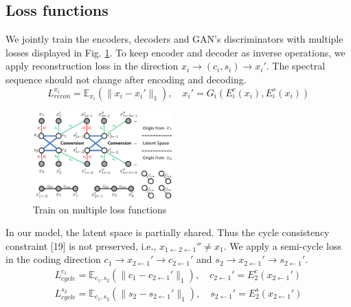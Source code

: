 \documentclass{article}
\begin{document}
\subsection{Loss functions}
We jointly train the encoders, decoders and GAN's discriminators with multiple losses displayed in Fig. \ref{loss}. To keep encoder and decoder as inverse operations, we apply reconstruction loss in the direction $x_i \rightarrow (c_i, s_i) \rightarrow x_i'$. The spectral sequence should not change after encoding and decoding.
\begin{equation}
L_{recon}^{x_i} = \mathbb{E}_{x_i}(\| x_i - x_i' \|_1), \quad x_i' = G_i(E_i^c(x_i), E_i^s(x_i))
\end{equation}

\begin{figure}[htb]
\includegraphics[width=0.48\textwidth]{FIG/loss}
\caption{Train on multiple loss functions}
\label{loss}
\end{figure}

In our model, the latent space is partially shared. Thus the cycle consistency constraint [19] is not preserved, i.e., $x_{1\leftarrow2\leftarrow1}'' \neq x_1$. We apply a semi-cycle loss in the coding direction $c_1 \rightarrow x_{2\leftarrow1}' \rightarrow c_{2\leftarrow1}'$ and $s_2 \rightarrow x_{2\leftarrow1}' \rightarrow s_{2\leftarrow1}'$.
\begin{equation}
\begin{aligned}
L_{cycle}^{c_1} = \mathbb{E}_{c_1, s_2} (\| c_1 - c_{2\leftarrow1}' \|_1), \quad c_{2\leftarrow1}'=E_2^c(x_{2\leftarrow1}') \\
L_{cycle}^{s_2} = \mathbb{E}_{c_1, s_2} (\| s_2 - s_{2\leftarrow1}' \|_1), \quad s_{2\leftarrow1}'=E_2^s(x_{2\leftarrow1}')
\end{aligned}
\end{equation}
\end{document}
